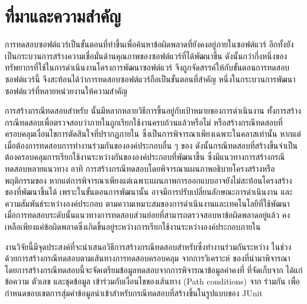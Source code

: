 \section{ที่มาและความสำคัญ} 
\label{sec:introduction}

การทดสอบซอฟต์แวร์เป็นขั้นตอนที่ทำขึ้นเพื่อค้นหาข้อผิดพลาดที่ยังคงอยู่ภายในซอฟต์แวร์ \cite{Myers:2011:AST:983238} 
อีกทั้งยังเป็นกระบวนการสร้างความเชื่อมั่นด้านคุณภาพของซอฟต์แวร์ที่ได้พัฒนาขึ้น ดังนั้นกว่ากึ่งหนึ่งของทรัพยากรที่ใช้ในการดำเนินงานโครงการพัฒนาซอฟต์แวร์
จึงถูกจัดสรรค์ให้กับขั้นตอนการทดสอบซอฟต์แวร์นี้ \cite{Jackson2007, Tassey2002} จึงสะท้อนได้ว่าการทดสอบซอฟต์แวร์ถือเป็นขั้นตอนที่สำคัญ
หนึ่งในกระบวนการพัฒนาซอฟต์แวร์ที่หลายหน่วยงานให้ความสำคัญ

การสร้างกรณีทดสอบสำหรับ\FirstTimeDefine{\SUT}{\SUTEN} นั้นมีหลากหลายวิธีการขึ้นอยู่กับเป้าหมายของการดำเนินงาน 
ทั้งการสร้างกรณีทดสอบเพื่อตรวจสอบว่า{\method}ภายใน\FirstTimeDefine{\CUT}{\CUTEN}ถูกเรียกใช้งานครบถ้วนแล้วหรือไม่ \cite{6847360}
หรือสร้างกรณีทดสอบที่ครอบคลุมเงื่อนไขการตัดสินใจที่ปรากฏภายใน{\CUT} \cite{Luanghirun2016} ซึ่งเป็นการพิจารณาเพียงเฉพาะในคลาสเท่านั้น
หากแต่เมื่อต้องการทดสอบการทำงานร่วมกันขององค์ประกอบอื่น ๆ ของ\FirstTimeDefine{\SUT}{\SUTEN} 
ดังนั้นกรณีทดสอบที่สร้างขึ้นจำเป็นต้องครอบคลุมการเรียกใช้งานระหว่างกันขององค์ประกอบที่พัฒนาขึ้น
ซึ่งมีแนวทางการสร้างกรณีทดสอบหลายแนวทาง อาทิ 
การสร้างกรณีทดสอบโดยพิจารณาแผนภาพอธิบายโครงสร้างหรือพฤติกรรมของ{\softwareComponent} \cite{Panthi2012, Shirole2013}
หากแต่การพิจารณาเพียงแต่เฉพาะแผนภาพการออกแบบอาจยังไม่สะท้อนโครงสร้างของ{\sourcecode}ที่พัฒนาขึ้นได้ 
เพราะในขั้นตอนการพัฒนานั้น อาจมีการปรับเปลี่ยนลักษณะการดำเนินงาน และความสัมพันธ์ระหว่างองค์ประกอบ 
ตามความเหมาะสมของการดำเนินงานและเทคโนโลยีที่ใช้พัฒนา 
เมื่อการทดสอบระดับ{\class}นั้นแนวทางการทดสอบส่วนย่อยที่สามารถตรวจสอบหาข้อผิดพลาดอยู่แล้ว 
คงเหลือเพียงแค่ข้อผิดพลาดซึ่งเกิดขึ้นอยู่ระหว่างการเรียกใช้งานระหว่างองค์ประกอบภายใน

งานวิจัยนี้มีจุดประสงค์ที่จะนำเสนอวิธีการสร้างกรณีทดสอบสำหรับ{\sourcecode}ซึ่งทำงานร่วมกันระหว่าง
ในช่วง\FirstTimeDefine{\IntegrationTesting}{\IntegrationTestingEN} ด้วยการสร้างกรณีทดสอบตามเส้นทางการทดสอบครอบคลุม
\FirstTimeDefine{\scg}{\scgen} จากการวิเคราะห์\FirstTimeDefine{\StaticInformation}{\StaticInformationEN} 
ของ{\sourcecode}ที่นำมาพิจารณา โดยการสร้างกรณีทดสอบนี้จะจัดเตรียมข้อมูลทดสอบจากการพิจารณาข้อมูลค่าคงที่ 
ที่จัดเก็บจาก{\sourcecode} ได้แก่ ข้อความ ตัวเลข และชุดข้อมูล 
เข้าร่วมกับเงื่อนไขของเส้นทาง (Path conditions) จาก{\cfg} 
ร่วมกัน เพื่อกำหนดขอบเขตการสุ่มค่าข้อมูลนำเข้าสำหรับกรณีทดสอบที่สร้างขึ้นในรูปแบบของ JUnit
